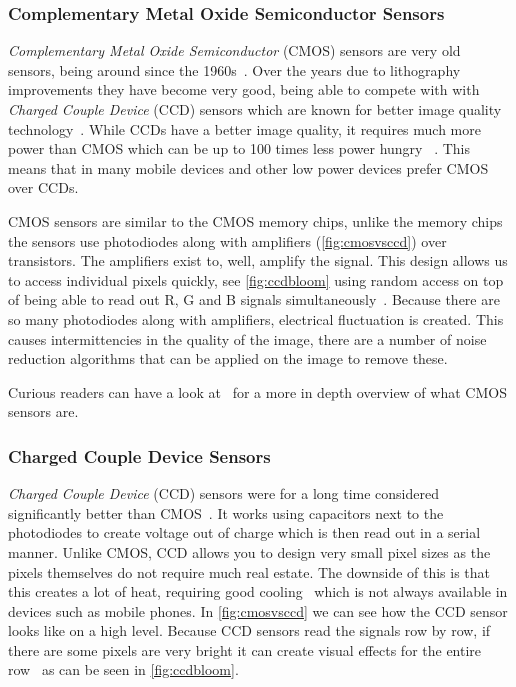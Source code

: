 \subsubsection{Complementary Metal Oxide Semiconductor Sensors}
\textit{Complementary Metal Oxide Semiconductor} (CMOS) sensors are very old
sensors, being around since the 1960s~\cite{ieeeCMOS}. Over the years due to
lithography improvements they have become very good, being able to compete with
with \textit{Charged Couple Device} (CCD) sensors which are known for better
image quality technology~\cite{ieeeCMOS}. While CCDs have a better image quality, it requires
much more power than CMOS which can be up to 100 times less power hungry~ \cite{CMOSReview}.
This means that in many mobile devices and other low power
devices prefer CMOS over CCDs.

CMOS sensors are similar to the CMOS memory chips, unlike the memory chips the
sensors use photodiodes along with amplifiers (\cref{fig:cmosvsccd}) over
transistors. The amplifiers exist to, well, amplify the signal. This design
allows us to access individual pixels quickly, see \cref{fig:ccdbloom} using
random access on top of being able to read out R, G and B signals
simultaneously~\cite{cmosAlen}. Because there are so many photodiodes along
with amplifiers, electrical fluctuation is created. This causes intermittencies
in the quality of the image, there are a number of noise reduction algorithms
that can be applied on the image to remove these.

Curious readers can have a look at~\cite{CMOSReview, ieeeCMOS} for a more
in depth overview of what CMOS sensors are.

\subsubsection{Charged Couple Device Sensors}
\textit{Charged Couple Device} (CCD) sensors were for a long time considered
significantly better than CMOS~\cite{ieeeCMOS}. It works using capacitors next
to the photodiodes to create voltage out of charge which is then read out in a
serial manner. Unlike CMOS, CCD allows you to design very small pixel sizes as
the pixels themselves do not require much real estate. The downside of this is
that this creates a lot of heat, requiring good cooling~\cite{meng2016numerical}
which is not always available in devices such as mobile phones. In
\cref{fig:cmosvsccd} we can see how the CCD sensor looks like on a high level.
Because CCD sensors read the signals row by row, if there are some pixels are
very bright it can create visual effects for the entire row~\cite{ieeeCMOS} as
can be seen in \cref{fig:ccdbloom}.


